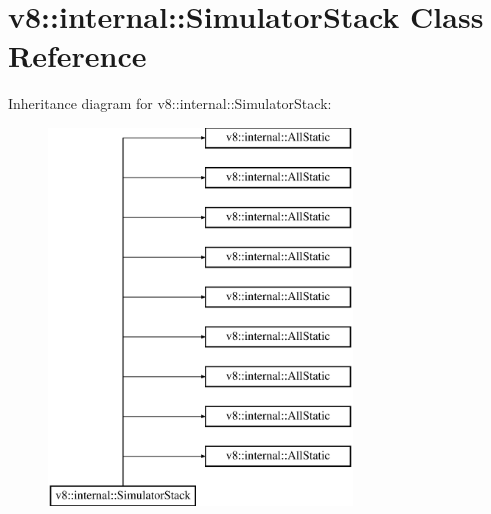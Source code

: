 \hypertarget{classv8_1_1internal_1_1_simulator_stack}{}\section{v8\+:\+:internal\+:\+:Simulator\+Stack Class Reference}
\label{classv8_1_1internal_1_1_simulator_stack}
Inheritance diagram for v8\+:\+:internal\+:\+:Simulator\+Stack\+:\begin{figure}[H]
\begin{center}
\leavevmode
\includegraphics[height=10.000000cm]{classv8_1_1internal_1_1_simulator_stack}
\end{center}
\end{figure}
